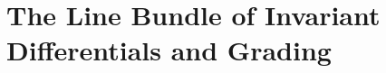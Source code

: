 \section{The Line Bundle of Invariant Differentials and Grading}\label{sec:chromatic-geometry-invariantdifferentials}
